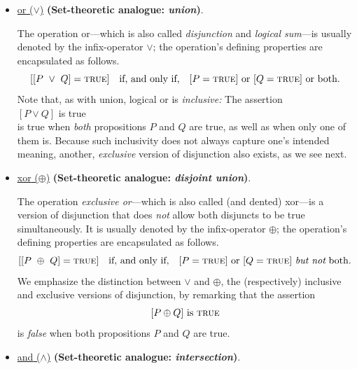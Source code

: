 \begin{itemize}
\item
\underline{{\sc or} ($\vee$)}
{\bf (Set-theoretic analogue: {\em union})}.

The operation {\sc or}---which is also called {\em disjunction} and
{\em logical sum}---is usually denoted by the infix-operator $\vee$;
the operation's defining properties are encapsulated as follows.
\[
[[P \ \vee \ Q] =  \mbox{\sc true}] \ \ \mbox{ if, and only if, } \ \ 
[P = \mbox{\sc true}] \mbox{ or }
[Q = \mbox{\sc true}] \mbox{ or both}.
\]
Note that, as with union, logical {\sc or} is {\em inclusive:}
The assertion \\
\hspace*{.35in}$[P \vee Q]$ is \mbox{\sc true} \\
%
is true when {\em both} propositions $P$ and $Q$ are true, as well as when only one
of them is.  Because such inclusivity does not always capture one's
intended meaning, another, {\em exclusive} version of disjunction also
exists, as we see next.

\item 
\underline{{\sc xor} ($\oplus$)}
{\bf (Set-theoretic analogue: {\em disjoint union})}.

The operation {\em exclusive or}---which is also called (and dented)
{\sc xor}---is a version of disjunction that does {\em not} allow both
disjuncts to be true simultaneously.  It is usually denoted by the
infix-operator $\oplus$; the operation's defining properties are
encapsulated as follows.
\[
[[P \ \oplus \ Q] =  \mbox{\sc true}] \ \ \mbox{ if, and only if, } \ \ 
[P = \mbox{\sc true}] \mbox{ or }
[Q = \mbox{\sc true}] \mbox{ {\em but not} both}.
\]
We emphasize the distinction between $\vee$ and $\oplus$, the
(respectively) inclusive and exclusive versions of disjunction, by
remarking that the assertion
\[
[P \oplus Q]  \mbox{ is } \mbox{\sc true}
\]
\noindent
is {\em false} when both propositions $P$ and $Q$ are true.

\item
\underline{{\sc and} ($\wedge$)}
{\bf (Set-theoretic analogue: {\em intersection})}.


\end{itemize}
